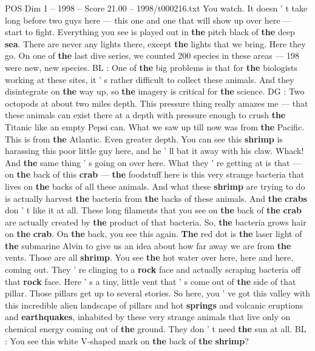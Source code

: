 \begin{textsample}{POS Dim 1 – 1998 – Score 21.00 – 1998/t000216.txt}
You watch.
It doesn ' t take long before two guys here — this one and one that will show up over here — start to fight.
Everything you see is played out in \textbf{the} pitch black of \textbf{the} deep \textbf{sea}.
There are never any lights there, except \textbf{the} lights that we bring.
Here they go.
On one of \textbf{the} last dive series, we counted 200 species in these areas — 198 were new, new species.
BL : One of \textbf{the} big problems is that for \textbf{the} biologists working at these sites, it ' s rather difficult to collect these animals.
And they disintegrate on \textbf{the} way up, so \textbf{the} imagery is critical for \textbf{the} science.
DG : Two octopods at about two miles depth.
This pressure thing really amazes me — that these animals can exist there at a depth with pressure enough to crush \textbf{the} Titanic like an empty Pepsi can.
What we saw up till now was from \textbf{the} Pacific.
This is from \textbf{the} Atlantic.
Even greater depth.
You can see this \textbf{shrimp} is harassing this poor little guy here, and he ' ll bat it away with his claw.
Whack!
And \textbf{the} same thing ' s going on over here.
What they ' re getting at is that — on \textbf{the} back of this \textbf{crab} — \textbf{the} foodstuff here is this very strange bacteria that lives on \textbf{the} backs of all these animals.
And what these \textbf{shrimp} are trying to do is actually harvest \textbf{the} bacteria from \textbf{the} backs of these animals.
And \textbf{the} \textbf{crabs} don ' t like it at all.
These long filaments that you see on \textbf{the} back of \textbf{the} \textbf{crab} are actually created by \textbf{the} product of that bacteria.
So, \textbf{the} bacteria grows hair on \textbf{the} \textbf{crab}.
On \textbf{the} back, you see this again. \textbf{The} red dot is \textbf{the} laser light of \textbf{the} submarine Alvin to give us an idea about how far away we are from \textbf{the} vents.
Those are all \textbf{shrimp}.
You see \textbf{the} hot water over here, here and here, coming out.
They ' re clinging to a \textbf{rock} face and actually scraping bacteria off that \textbf{rock} face.
Here ' s a tiny, little vent that ' s come out of \textbf{the} side of that pillar.
Those pillars get up to several stories.
So here, you ' ve got this valley with this incredible alien landscape of pillars and hot \textbf{springs} and volcanic eruptions and \textbf{earthquakes}, inhabited by these very strange animals that live only on chemical energy coming out of \textbf{the} ground.
They don ' t need \textbf{the} sun at all.
BL : You see this white V-shaped mark on \textbf{the} back of \textbf{the} \textbf{shrimp}?

\end{textsample}
